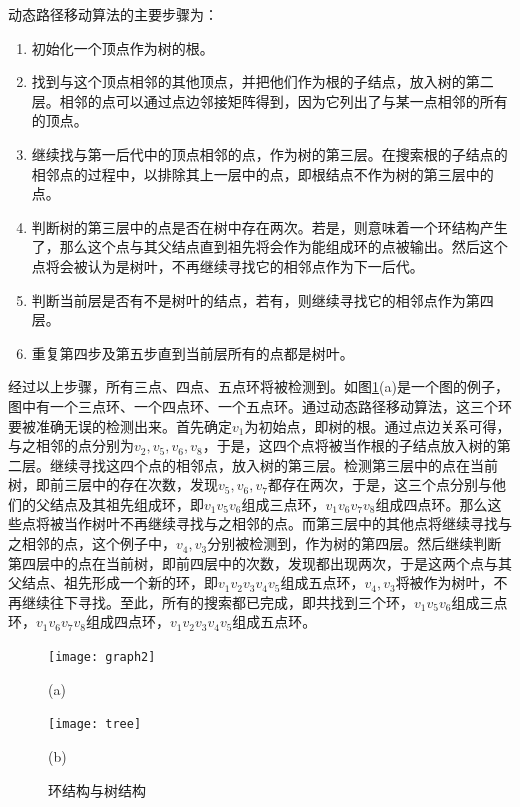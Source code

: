 动态路径移动算法的主要步骤为：
\begin{enumerate}
\item 初始化一个顶点作为树的根。
\item 找到与这个顶点相邻的其他顶点，并把他们作为根的子结点，放入树的第二层。相邻的点可以通过点边邻接矩阵得到，因为它列出了与某一点相邻的所有的顶点。
\item 继续找与第一后代中的顶点相邻的点，作为树的第三层。在搜索根的子结点的相邻点的过程中，以排除其上一层中的点，即根结点不作为树的第三层中的点。
\item 判断树的第三层中的点是否在树中存在两次。若是，则意味着一个环结构产生了，那么这个点与其父结点直到祖先将会作为能组成环的点被输出。然后这个点将会被认为是树叶，不再继续寻找它的相邻点作为下一后代。
\item 判断当前层是否有不是树叶的结点，若有，则继续寻找它的相邻点作为第四层。
\item 重复第四步及第五步直到当前层所有的点都是树叶。
\end{enumerate}
经过以上步骤，所有三点、四点、五点环将被检测到。如图\ref{fig:cycle-tree}(a)是一个图的例子，图中有一个三点环、一个四点环、一个五点环。通过动态路径移动算法，这三个环要被准确无误的检测出来。首先确定$v_1$为初始点，即树的根。通过点边关系可得，与之相邻的点分别为$v_2, v_5, v_6, v_8$，于是，这四个点将被当作根的子结点放入树的第二层。继续寻找这四个点的相邻点，放入树的第三层。检测第三层中的点在当前树，即前三层中的存在次数，发现$v_5, v_6, v_7$都存在两次，于是，这三个点分别与他们的父结点及其祖先组成环，即$v_{1}v_{5}v_{6}$组成三点环，$v_{1}v_{6}v_{7}v_{8}$组成四点环。那么这些点将被当作树叶不再继续寻找与之相邻的点。而第三层中的其他点将继续寻找与之相邻的点，这个例子中，$v_4, v_3$分别被检测到，作为树的第四层。然后继续判断第四层中的点在当前树，即前四层中的次数，发现都出现两次，于是这两个点与其父结点、祖先形成一个新的环，即$v_{1}v_{2}v_{3}v_{4}v_{5}$组成五点环，$v_4, v_3$将被作为树叶，不再继续往下寻找。至此，所有的搜索都已完成，即共找到三个环，$v_{1}v_{5}v_{6}$组成三点环，$v_{1}v_{6}v_{7}v_{8}$组成四点环，$v_{1}v_{2}v_{3}v_{4}v_{5}$组成五点环。

\begin{figure}
\centering

  \begin{minipage}[b]{1\textwidth} 
      \centering 
       \texttt{[image: graph2]}
       \centerline{(a)}\medskip
    \end{minipage}
  \begin{minipage}[b]{1\textwidth}
    \centering
    \texttt{[image: tree]}
    \centerline{(b)}\medskip
  \end{minipage}
\caption{环结构与树结构}
\label{fig:cycle-tree}
\end{figure}

